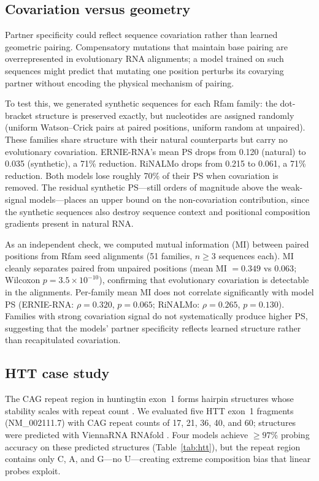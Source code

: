 \documentclass[11pt]{article}
\begin{document}
\subsection{Covariation versus geometry}
\label{sec:covariation-results}

Partner specificity could reflect sequence covariation rather than
learned geometric pairing. Compensatory mutations that maintain base
pairing are overrepresented in evolutionary RNA alignments; a model
trained on such sequences might predict that mutating one position
perturbs its covarying partner without encoding the physical mechanism
of pairing.

To test this, we generated synthetic sequences for each Rfam family:
the dot-bracket structure is preserved exactly, but nucleotides are
assigned randomly (uniform Watson--Crick pairs at paired positions,
uniform random at unpaired). These families share structure with their
natural counterparts but carry no evolutionary covariation.
ERNIE-RNA's mean PS drops from 0.120 (natural) to 0.035 (synthetic),
a 71\% reduction. RiNALMo drops from 0.215 to 0.061, a 71\%
reduction. Both models lose roughly 70\% of their PS when covariation
is removed. The residual synthetic PS---still orders of magnitude
above the weak-signal models---places an upper bound on the
non-covariation contribution, since the synthetic sequences also
destroy sequence context and positional composition gradients present
in natural RNA.

As an independent check, we computed mutual information (MI) between
paired positions from Rfam seed alignments (51 families, $n \geq 3$
sequences each). MI cleanly separates paired from unpaired positions
(mean MI $= 0.349$ vs $0.063$; Wilcoxon $p = 3.5 \times 10^{-10}$),
confirming that evolutionary covariation is detectable in the
alignments. Per-family mean MI does not correlate significantly with
model PS (ERNIE-RNA: $\rho = 0.320$, $p = 0.065$; RiNALMo:
$\rho = 0.265$, $p = 0.130$). Families with strong covariation signal
do not systematically produce higher PS, suggesting that the models'
partner specificity reflects learned structure rather than
recapitulated covariation.


\subsection{HTT case study}
\label{sec:htt-results}

The CAG repeat region in huntingtin exon~1 forms hairpin structures whose
stability scales with repeat count \citep{demezer2011mutant,
krzyzosiak2012triplet}. We evaluated five HTT exon~1 fragments
(NM\_002111.7) with CAG repeat counts of 17, 21, 36, 40, and 60;
structures were predicted with ViennaRNA RNAfold
\citep{lorenz2011viennarna}. Four models achieve $\geq 97$\% probing
accuracy on these predicted structures (Table~\ref{tab:htt}), but the
repeat region contains only C, A, and G---no U---creating extreme
composition bias that linear probes exploit.
\end{document}
